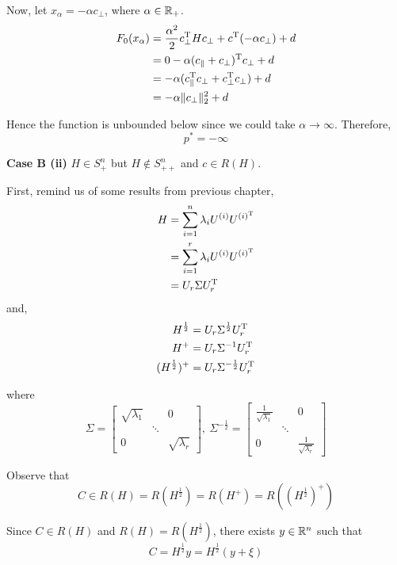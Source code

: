 Now, let $x_{\alpha} =-\alpha c_{\perp}$, where $\alpha \in \mathbb{R}_+$.
\begin{align*}
F_0(x_{\alpha}) 
&=\frac{{\alpha}^2}{2}c_{\perp}^{{\rm T}}Hc_{\perp} + c^{{\rm T}}(-\alpha c_{\perp}) + d\\
&= 0 - \alpha(c_{\Vert} + c_{\perp})^{{\rm T}}c_{\perp} + d\\
&= -\alpha(c_{\Vert}^{{\rm T}}c_{\perp} + c_{\perp}^{{\rm T}}c_{\perp}) + d\\
&= -\alpha \Vert c_{\perp}\Vert^2_2 + d
\end{align*}

Hence the function is unbounded below since we could take $\alpha \to\infty$. Therefore,
$$p^*=-\infty$$



\vspace{0.3cm}
\textbf{Case B (ii)}  $H\in S_+^n$ but $H\notin S^n_{++}$ and $c \in R(H)$.

First, remind us of some results from previous chapter,
\begin{align*}
H 
&= \sum^n_{i=1}\lambda_i U^{(i)}U^{(i)^{{\rm T}}} \\
&= \sum^r_{i=1}\lambda_i U^{(i)}U^{(i)^{{\rm T}}}\\
&= U_r\Sigma U_r^{{\rm T}}
\end{align*}
and,
\begin{align*}
H^{\frac{1}{2}} &= U_r\Sigma^{\frac{1}{2}}U_r^{{\rm T}}\\
H^{+} &= U_r\Sigma^{-1}U_r^{{\rm T}}\\
(H^{\frac{1}{2}})^+ &= U_r\Sigma^{-\frac{1}{2}}U_r^{{\rm T}}
\end{align*}

where 
$$\Sigma = 
\begin{bmatrix}
\sqrt{\lambda_1} &  & 0 \\
&\ddots&\\
0&&\sqrt{\lambda_r}
\end{bmatrix}
,\
\Sigma^{-\frac{1}{2}} =
\begin{bmatrix}
\frac{1}{\sqrt{\lambda_1}} &  & 0 \\
&\ddots&\\
0&&\frac{1}{\sqrt{\lambda_r}}
\end{bmatrix}
$$

Observe that
$$C\in R(H) = R(H^{\frac{1}{2}}) = R(H^+) = R\left((H^{\frac{1}{2}})^+\right)$$

Since $C\in R(H)$ and $R(H) = R(H^{\frac{1}{2}})$, there exists $y \in \mathbb{R}^n$ such that
$$C = H^{\frac{1}{2}}y = H^{\frac{1}{2}}(y+\xi)$$


